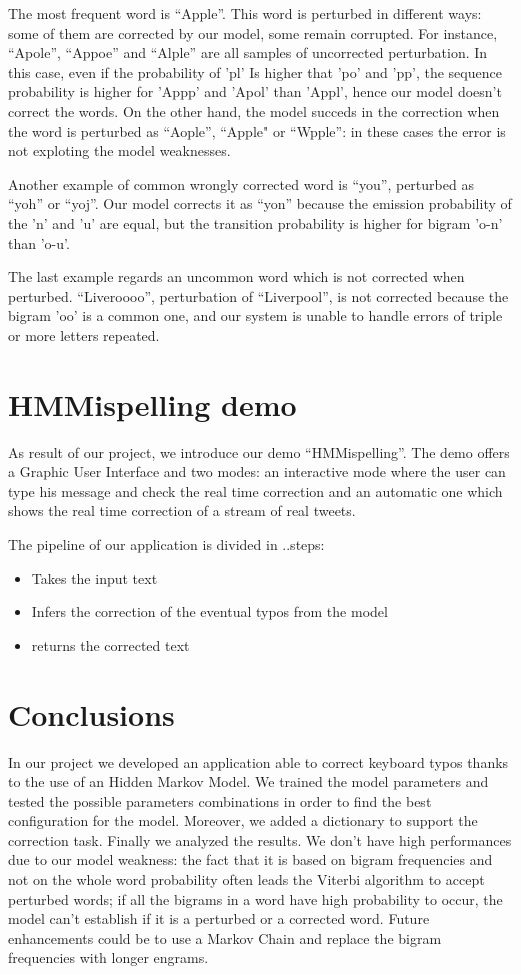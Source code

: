 \documentclass[12pt]{article}
\begin{document}
The most frequent word is ``Apple''. This word is perturbed in different ways:
some of them are corrected by our model, some remain corrupted. For instance,
``Apole'', ``Appoe'' and ``Alple'' are all samples of uncorrected perturbation.
In this case, even if the probability of 'pl' Is higher that 'po' and 'pp', the
sequence probability is higher for 'Appp' and 'Apol' than 'Appl', hence our
model doesn't correct the words.
On the other hand, the model succeds in the correction when the word is
perturbed as ``Aople'', ``Apple" or ``Wpple'': in these cases the error is
not exploting the model weaknesses.

Another example of common wrongly corrected word is ``you'', perturbed as
``yoh'' or  ``yoj''. Our model corrects it as ``yon'' because the emission
probability of the 'n' and 'u' are equal, but the transition probability is
higher for bigram 'o-n' than 'o-u'.

The last example regards an uncommon word which is not corrected when perturbed.
``Liveroooo'', perturbation of ``Liverpool'', is not corrected because the
bigram 'oo' is a common one, and our system is unable to handle errors of triple
or more letters repeated.

\section{HMMispelling demo}
As result of our project, we introduce our demo ``HMMispelling''. The demo
offers a Graphic User Interface and two modes: an interactive mode where the
user can type his message and check the real time correction and an automatic
one which shows the real time correction of a stream of real tweets.

The pipeline of our application is divided in ..steps:
\begin{itemize}
  \item Takes the input text
  \item Infers the correction of the eventual typos from the model
  \item returns the corrected text
\end{itemize}

\section{Conclusions}
In our project we developed an application able to correct keyboard typos thanks
to the use of an Hidden Markov Model.  We trained the model parameters and
tested the possible parameters combinations in order to find the best
configuration for the model. Moreover, we added a dictionary to support the
correction task. Finally we analyzed the results. We don't have high
performances due to our model weakness: the fact that it is based on bigram
frequencies and not on the whole word probability often leads the Viterbi
algorithm to accept perturbed words; if all the bigrams in a word have high
probability to occur, the model can't establish if it is a perturbed or a
corrected word. Future enhancements could be to use a Markov Chain and replace
the bigram frequencies with longer engrams.
\end{document}
